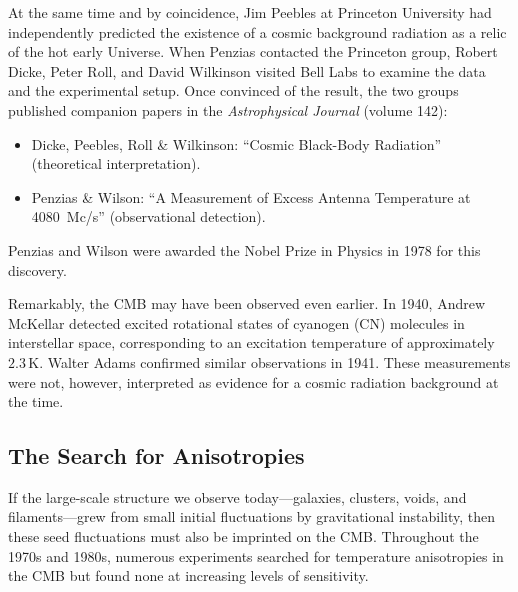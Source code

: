 At the same time and by coincidence, Jim Peebles at Princeton University had independently predicted the existence of a cosmic background radiation as a relic of the hot early Universe. When Penzias contacted the Princeton group, Robert Dicke, Peter Roll, and David Wilkinson visited Bell Labs to examine the data and the experimental setup. Once convinced of the result, the two groups published companion papers in the \textit{Astrophysical Journal} (volume 142):
\begin{itemize}
    \item Dicke, Peebles, Roll \& Wilkinson: ``Cosmic Black-Body Radiation'' (theoretical interpretation).
    \item Penzias \& Wilson: ``A Measurement of Excess Antenna Temperature at 4080~Mc/s'' (observational detection).
\end{itemize}
Penzias and Wilson were awarded the Nobel Prize in Physics in 1978 for this discovery.


Remarkably, the CMB may have been observed even earlier. In 1940, Andrew McKellar detected excited rotational states of cyanogen (CN) molecules in interstellar space, corresponding to an excitation temperature of approximately $2.3\,\mathrm{K}$. Walter Adams confirmed similar observations in 1941. These measurements were not, however, interpreted as evidence for a cosmic radiation background at the time.

\subsection*{The Search for Anisotropies}

If the large-scale structure we observe today---galaxies, clusters, voids, and filaments---grew from small initial fluctuations by gravitational instability, then these seed fluctuations must also be imprinted on the CMB. Throughout the 1970s and 1980s, numerous experiments searched for temperature anisotropies in the CMB but found none at increasing levels of sensitivity.

